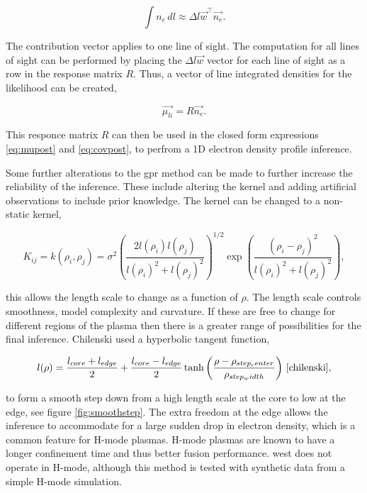 \begin{equation}
  \int n_e \, dl \approx \Delta l \vec{w}^{\top} \vec{n_e}.
\end{equation}

\noindent The contribution vector applies to one line of sight. The computation for all lines of sight can be performed by placing the $\Delta l \vec{w}$ vector for each line of sight as a row in the response matrix $R$. Thus, a vector of line integrated densities for the likelihood can be created,

\begin{equation}
  \vec{\mu_{li}} = R \vec{n_e}.
\end{equation}

\noindent This responce matrix $R$ can then be used in the closed form expressions \ref{eq:mupost} and \ref{eq:covpost}, to perfrom a 1D electron density profile inference.

Some further alterations to the \gls{gpr} method can be made to further increase the reliability of the inference. These include altering the kernel and adding artificial observations to include prior knowledge. The kernel can be changed to a non-static kernel, 

\begin{equation}
  K_{ij} = k(\rho_i, \rho_j) = \sigma^2 \left( \frac{2l(\rho_i)l(\rho_j)}{l(\rho_i)^2 + l(\rho_j)^2} \right)^{1/2} \exp\left({\frac{(\rho_i - \rho_j)^2}{l(\rho_i)^2+l(\rho_j)^2}}\right),
\end{equation}

\noindent this allows the length scale to change as a function of $\rho$. The length scale controls smoothness, model complexity and curvature. If these are free to change for different regions of the plasma then there is a greater range of possibilities for the final inference. Chilenski used a hyperbolic tangent function,

\begin{equation}
  l(\rho) = \frac{l_{core} + l_{edge}}{2} + \frac{l_{core} - l_{edge}}{2} \tanh\left(\frac{\rho-\rho_{step_center}}{\rho_{step_width}}\right) \, \cite{chilenski}, 
  \label{eq:smoothstep}
\end{equation}

\noindent to form a smooth step down from a high length scale at the core to low at the edge, see figure \ref{fig:smoothstep}. The extra freedom at the edge allows the inference to accommodate for a large sudden drop in electron density, which is a common feature for H-mode plasmas. H-mode plasmas are known to have a longer confinement time and thus better fusion performance. \gls{west} does not operate in H-mode, although this method is tested with synthetic data from a simple H-mode simulation.

